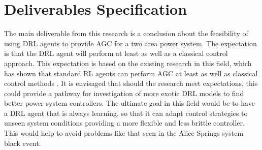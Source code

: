 \section{Deliverables Specification}
The main deliverable from this research is a conclusion about the feasibility of using DRL agents to provide AGC for a two area power system. The expectation is that the DRL agent will perform at least as well as a classical control approach. This expectation is based on the existing research in this field, which has shown that standard RL agents can perform AGC at least as well as classical control methods \cite{Ahamed2002}. It is envisaged that should the research meet expectations, this could provide a pathway for investigation of more exotic DRL models to find better power system controllers. The ultimate goal in this field would be to have a DRL agent that is always learning, so that it can adapt control strategies to unseen system conditions providing a more flexible and less brittle controller. This would help to avoid problems like that seen in the Alice Springs system black event.\\